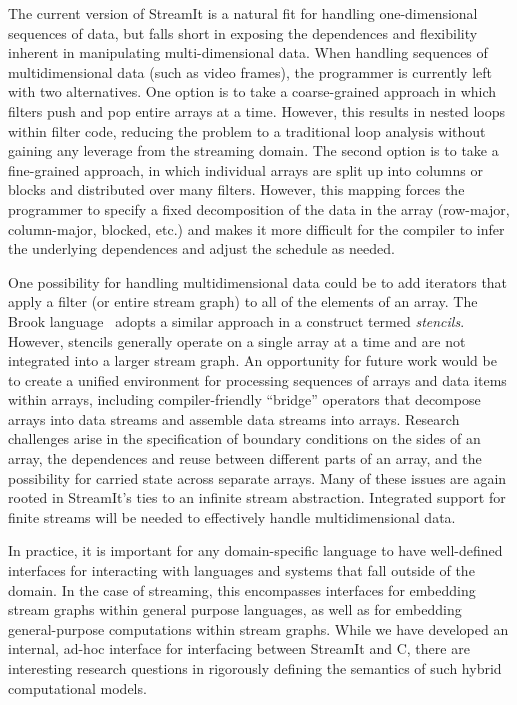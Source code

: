   The current version of StreamIt is
  a natural fit for handling one-dimensional sequences of data, but
  falls short in exposing the dependences and flexibility inherent in
  manipulating multi-dimensional data.  When handling sequences of
  multidimensional data (such as video frames), the programmer is
  currently left with two alternatives.  One option is to take a
  coarse-grained approach in which filters push and pop entire arrays
  at a time.  However, this results in nested loops within filter
  code, reducing the problem to a traditional loop analysis without
  gaining any leverage from the streaming domain.  The second option
  is to take a fine-grained approach, in which individual arrays are
  split up into columns or blocks and distributed over many filters.
  However, this mapping forces the programmer to specify a fixed
  decomposition of the data in the array (row-major, column-major,
  blocked, etc.) and makes it more difficult for the compiler to infer
  the underlying dependences and adjust the schedule as needed.

  One possibility for handling multidimensional data could be to add
  iterators that apply a filter (or entire stream graph) to all of the
  elements of an array.  The Brook language~\cite{brook04} adopts a
  similar approach in a construct termed {\it stencils}.  However,
  stencils generally operate on a single array at a time and are not
  integrated into a larger stream graph.  An opportunity for future
  work would be to create a unified environment for processing
  sequences of arrays and data items within arrays, including
  compiler-friendly ``bridge'' operators that decompose arrays into
  data streams and assemble data streams into arrays.  Research
  challenges arise in the specification of boundary conditions on the
  sides of an array, the dependences and reuse between different parts
  of an array, and the possibility for carried state across separate
  arrays.  Many of these issues are again rooted in StreamIt's ties to
  an infinite stream abstraction.  Integrated support for finite
  streams will be needed to effectively handle multidimensional data.

  In practice, it is important for any
  domain-specific language to have well-defined interfaces for
  interacting with languages and systems that fall outside of the
  domain.  In the case of streaming, this encompasses interfaces for
  embedding stream graphs within general purpose languages, as well as
  for embedding general-purpose computations within stream graphs.
  While we have developed an internal, ad-hoc interface for
  interfacing between StreamIt and C, there are interesting research
  questions in rigorously defining the semantics of such hybrid
  computational models. 

